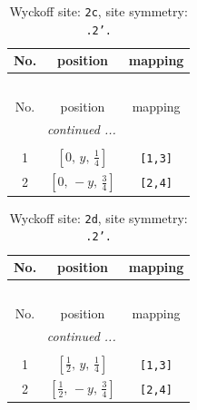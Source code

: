 \documentclass[fleqn,8pt]{jsarticle}
\begin{document}
\begin{longtable}{ccc}
\caption{Wyckoff site: {\tt 2c}, site symmetry: {\tt .2'.}}
 \\
 \hline \hline
No. & position & mapping \\ \hline \endfirsthead

\multicolumn{2}{l}{\tablename\ \thetable{}} \\
 \hline \hline
No. & position & mapping \\ \hline \endhead

 \hline \hline
\multicolumn{2}{r}{\footnotesize\it continued ...} \\ \endfoot

 \hline \hline
\multicolumn{2}{r}{} \\ \endlastfoot

1 & $\left[ 0,\, y,\, \frac{1}{4} \right]$ & {\tt [1,3]} \\ \hline
2 & $\left[ 0,\, - y,\, \frac{3}{4} \right]$ & {\tt [2,4]} \\
\end{longtable}
\renewcommand{\arraystretch}{1.2}
\begin{longtable}{ccc}
\caption{Wyckoff site: {\tt 2d}, site symmetry: {\tt .2'.}}
 \\
 \hline \hline
No. & position & mapping \\ \hline \endfirsthead

\multicolumn{2}{l}{\tablename\ \thetable{}} \\
 \hline \hline
No. & position & mapping \\ \hline \endhead

 \hline \hline
\multicolumn{2}{r}{\footnotesize\it continued ...} \\ \endfoot

 \hline \hline
\multicolumn{2}{r}{} \\ \endlastfoot

1 & $\left[ \frac{1}{2},\, y,\, \frac{1}{4} \right]$ & {\tt [1,3]} \\ \hline
2 & $\left[ \frac{1}{2},\, - y,\, \frac{3}{4} \right]$ & {\tt [2,4]} \\
\end{longtable}
\renewcommand{\arraystretch}{1.2}
\end{document}
